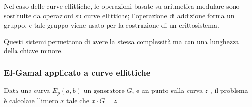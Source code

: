\noindent Nel caso delle curve ellittiche, le operazioni basate su aritmetica modulare sono 
sostituite da operazioni su curve ellittiche; l'operazione di addizione forma un gruppo, e 
tale gruppo viene usato per la costruzione di un crittosistema.

\noindent Questi sistemi permettono di avere la stessa complessità ma con una lunghezza della 
chiave minore.

\subsubsection{El-Gamal applicato a curve ellittiche}

Data una curva $E_p(a,b)$ un generatore $G$, e un
punto sulla curva $z$ , il problema è calcolare l'intero $x$ tale che $x \cdot G = z$



